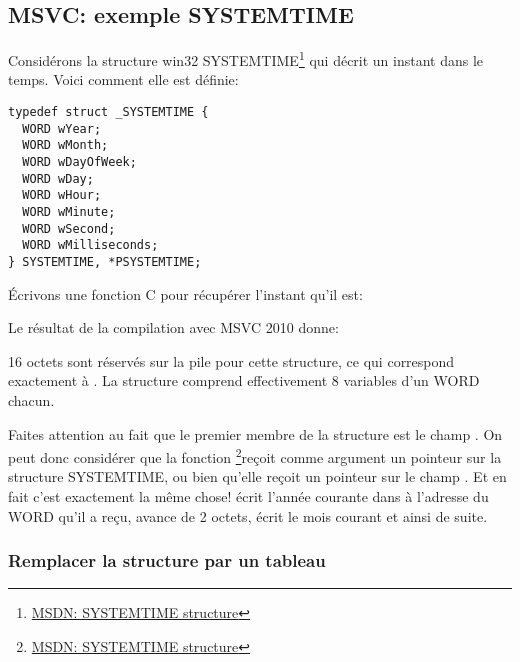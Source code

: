﻿\subsection{MSVC: exemple SYSTEMTIME}
\label{sec:SYSTEMTIME}

\newcommand{\FNSYSTEMTIME}{\footnote{\href{http://go.yurichev.com/17260}{MSDN: SYSTEMTIME structure}}}

Considérons la structure win32 SYSTEMTIME\FNSYSTEMTIME{} qui décrit un instant dans le temps. Voici
comment elle est définie:

\begin{lstlisting}[caption=WinBase.h,style=customc]
typedef struct _SYSTEMTIME {
  WORD wYear;
  WORD wMonth;
  WORD wDayOfWeek;
  WORD wDay;
  WORD wHour;
  WORD wMinute;
  WORD wSecond;
  WORD wMilliseconds;
} SYSTEMTIME, *PSYSTEMTIME;
\end{lstlisting}

Écrivons une fonction C pour récupérer l'instant qu'il est:



Le résultat de la compilation avec MSVC 2010 donne:



16 octets sont réservés sur la pile pour cette structure, ce qui correspond exactement à
. La structure comprend effectivement 8 variables d'un WORD chacun.

\newcommand{\FNMSDNGST}{\footnote{\href{http://go.yurichev.com/17261}{MSDN: GetSystemTime function}}}

Faites attention au fait que le premier membre de la structure est le champ .
On peut donc considérer que la fonction \FNSYSTEMTIME reçoit comme argument
un pointeur sur la structure SYSTEMTIME, ou bien qu'elle reçoit un pointeur sur le champ .
Et en fait c'est exactement la même chose!
 écrit l'année courante dans à l'adresse du WORD qu'il a reçu, avance de 2
octets, écrit le mois courant et ainsi de suite.



\subsubsection{Remplacer la structure par un tableau}

